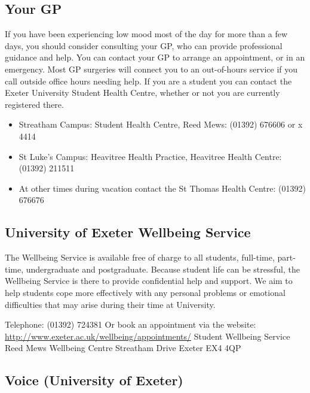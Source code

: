 \subsection{Your GP}

If you have been experiencing low mood most of the day for more than
a few days, you should consider consulting your GP, who can provide
professional guidance and help. You can contact your GP to arrange an
appointment, or in an emergency. Most GP surgeries will connect you to an
out-of-hours service if you call outside office hours needing help. If
you are a student you can contact the Exeter University Student Health
Centre, whether or not you are currently registered there.

\begin{itemize}
  \item Streatham Campus: Student Health Centre, Reed Mews: (01392) 676606 or x 4414
  \item St Luke's Campus: Heavitree Health Practice, Heavitree Health Centre: (01392) 211511
  \item At other times during vacation contact the St Thomas Health Centre: (01392) 676676
\end{itemize}

\subsection{University of Exeter Wellbeing Service}

The Wellbeing Service is available free of charge to all students,
full-time, part-time, undergraduate and postgraduate.  Because student
life can be stressful, the Wellbeing Service is there to provide
confidential help and support. We aim to help students cope more
effectively with any personal problems or emotional difficulties that
may arise during their time at University.

Telephone: (01392) 724381\newline
Or book an appointment via the website: \url{http://www.exeter.ac.uk/wellbeing/appointments/}\newline
Student Wellbeing Service\newline
Reed Mews Wellbeing Centre\newline
Streatham Drive\newline
Exeter EX4 4QP

\subsection{Voice (University of Exeter)}

